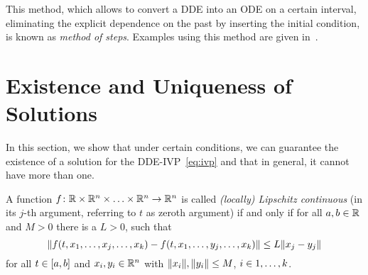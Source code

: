     This method, which allows to convert a DDE into an ODE on a certain interval, eliminating the explicit dependence on the past by inserting the initial condition, is known as \emph{method of steps}.
    Examples using this method are given in~\cite{Falbo06FDEs}.



\section{Existence and Uniqueness of Solutions}
    \label{solutions-existence-uniqueness}

    In this section, we show that under certain conditions, we can guarantee the existence of a solution for the DDE-IVP~\eqref{eq:ivp} and that in general, it cannot have more than one. 


    \begin{definition}\label{def:lipschitz}
        A function $f\colon\mathbb{R}\times\mathbb{R}^n\times\ldots\times\mathbb{R}^n\to\mathbb{R}^n$ is called \emph{(locally) Lipschitz continuous} (in its $j$-th argument, referring to $t$ as zeroth argument) if and only if for all $a,b\in\mathbb{R}$ and $M>0$ there is a $L>0$, such that
        \begin{equation*}
            \nnorm*{f(t,x_1,\ldots,x_j,\ldots,x_k) - f(t,x_1,\ldots,y_j,\ldots,x_k)} \leq L\nnorm*{x_j-y_j}
        \end{equation*}
        for all $t\in[a,b]$ and $x_i,y_i\in\mathbb{R}^n$ with $\lVert x_i\rVert,\lVert y_i\rVert\leq M$, $i\in1,\ldots,k$.
    \end{definition}



